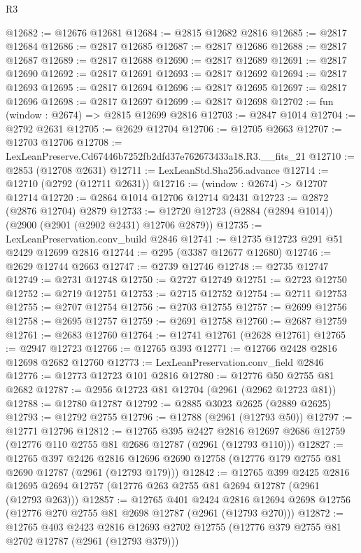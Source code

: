 \begin{lexlean}{R3}
\begin{coremodule}
@12682 := @12676 @12681
@12684 := @2815 @12682 @2816
@12685 := @2817 @12684
@12686 := @2817 @12685
@12687 := @2817 @12686
@12688 := @2817 @12687
@12689 := @2817 @12688
@12690 := @2817 @12689
@12691 := @2817 @12690
@12692 := @2817 @12691
@12693 := @2817 @12692
@12694 := @2817 @12693
@12695 := @2817 @12694
@12696 := @2817 @12695
@12697 := @2817 @12696
@12698 := @2817 @12697
@12699 := @2817 @12698
@12702 := fun (window : @2674) => @2815 @12699 @2816
@12703 := @2847 @1014
@12704 := @2792 @2631
@12705 := @2629 @12704
@12706 := @12705 @2663
@12707 := @12703 @12706
@12708 := LexLeanPreserve.Cd67446b7252fb2dfd37e762673433a18.R3.__fits_21
@12710 := @2853 (@12708 @2631)
@12711 := LexLeanStd.Sha256.advance
@12714 := @12710 (@2792 (@12711 @2631))
@12716 := (window : @2674) -> @12707 @12714
@12720 := @2864 @1014 @12706 @12714 @2431
@12723 := @2872 (@2876 @12704) @2879
@12733 := @12720 @12723 (@2884 (@2894 @1014)) (@2900 (@2901 (@2902 @2431) @12706 @2879))
@12735 := LexLeanPreservation.conv_build @2846
@12741 := @12735 @12723 @291 @51 @2429 @12699 @2816
@12744 := @295 (@3387 @12677 @12680)
@12746 := @2629 @12744 @2663
@12747 := @2739 @12746
@12748 := @2735 @12747
@12749 := @2731 @12748
@12750 := @2727 @12749
@12751 := @2723 @12750
@12752 := @2719 @12751
@12753 := @2715 @12752
@12754 := @2711 @12753
@12755 := @2707 @12754
@12756 := @2703 @12755
@12757 := @2699 @12756
@12758 := @2695 @12757
@12759 := @2691 @12758
@12760 := @2687 @12759
@12761 := @2683 @12760
@12764 := @12741 @12761 (@2628 @12761)
@12765 := @2947 @12723
@12766 := @12765 @393
@12771 := @12766 @2428 @2816 @12698 @2682 @12760
@12773 := LexLeanPreservation.conv_field @2846
@12776 := @12773 @12723 @101 @2816
@12780 := @12776 @50 @2755 @81 @2682
@12787 := @2956 @12723 @81 @12704 (@2961 (@2962 @12723 @81))
@12788 := @12780 @12787
@12792 := @2885 @3023 @2625 (@2889 @2625)
@12793 := @12792 @2755
@12796 := @12788 (@2961 (@12793 @50))
@12797 := @12771 @12796
@12812 := @12765
    @395
    @2427
    @2816
    @12697
    @2686
    @12759
    (@12776 @110 @2755 @81 @2686 @12787 (@2961 (@12793 @110)))
@12827 := @12765
    @397
    @2426
    @2816
    @12696
    @2690
    @12758
    (@12776 @179 @2755 @81 @2690 @12787 (@2961 (@12793 @179)))
@12842 := @12765
    @399
    @2425
    @2816
    @12695
    @2694
    @12757
    (@12776 @263 @2755 @81 @2694 @12787 (@2961 (@12793 @263)))
@12857 := @12765
    @401
    @2424
    @2816
    @12694
    @2698
    @12756
    (@12776 @270 @2755 @81 @2698 @12787 (@2961 (@12793 @270)))
@12872 := @12765
    @403
    @2423
    @2816
    @12693
    @2702
    @12755
    (@12776 @379 @2755 @81 @2702 @12787 (@2961 (@12793 @379)))

\end{coremodule}
\end{lexlean}
